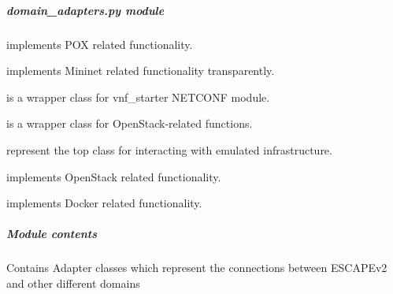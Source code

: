\documentclass[letterpaper,10pt,english]{sphinxmanual}
\begin{document}
\subparagraph{\emph{domain\_adapters.py} module}
\label{adapt/domain_adapters:domain-adapters-py-module}\label{adapt/domain_adapters::doc}
{\hyperref[adapt/domain_adapters:escape.adapt.domain_adapters.POXDomainAdapter]{\emph{}}} implements POX related functionality.

{\hyperref[adapt/domain_adapters:escape.adapt.domain_adapters.MininetDomainAdapter]{\emph{}}} implements Mininet related functionality
transparently.

{\hyperref[adapt/domain_adapters:escape.adapt.domain_adapters.VNFStarterAdapter]{\emph{}}} is a wrapper class for vnf\_starter NETCONF module.

{\hyperref[adapt/domain_adapters:escape.adapt.domain_adapters.OpenStackRESTAdapter]{\emph{}}} is a wrapper class for OpenStack-related functions.

{\hyperref[adapt/domain_adapters:escape.adapt.domain_adapters.InternalDomainManager]{\emph{}}} represent the top class for interacting with
emulated infrastructure.

{\hyperref[adapt/domain_adapters:escape.adapt.domain_adapters.OpenStackDomainManager]{\emph{}}} implements OpenStack related functionality.

{\hyperref[adapt/domain_adapters:escape.adapt.domain_adapters.DockerDomainManager]{\emph{}}} implements Docker related functionality.


\subparagraph{Module contents}
\label{adapt/domain_adapters:module-escape.adapt.domain_adapters}\label{adapt/domain_adapters:module-contents}
Contains Adapter classes which represent the connections between ESCAPEv2 and
other different domains
\end{document}
